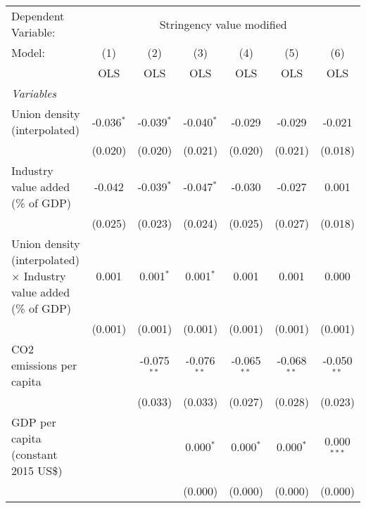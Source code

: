 
\begingroup
\centering
\begin{tabular}{lcccccc}
   \toprule
   Dependent Variable: & \multicolumn{6}{c}{Stringency value modified}\\
   Model:                                                                   & (1)          & (2)           & (3)           & (4)           & (5)           & (6)\\  
                                                                            &  OLS         & OLS           & OLS           & OLS           & OLS           & OLS\\  
   \midrule
   \emph{Variables}\\
   Union density (interpolated)                                             & -0.036$^{*}$ & -0.039$^{*}$  & -0.040$^{*}$  & -0.029        & -0.029        & -0.021\\   
                                                                            & (0.020)      & (0.020)       & (0.021)       & (0.020)       & (0.021)       & (0.018)\\   
   Industry value added (\% of GDP)                                         & -0.042       & -0.039$^{*}$  & -0.047$^{*}$  & -0.030        & -0.027        & 0.001\\   
                                                                            & (0.025)      & (0.023)       & (0.024)       & (0.025)       & (0.027)       & (0.018)\\   
   Union density (interpolated) $\times$ Industry value added (\% of GDP)   & 0.001        & 0.001$^{*}$   & 0.001$^{*}$   & 0.001         & 0.001         & 0.000\\   
                                                                            & (0.001)      & (0.001)       & (0.001)       & (0.001)       & (0.001)       & (0.001)\\   
   CO2 emissions per capita                                                 &              & -0.075$^{**}$ & -0.076$^{**}$ & -0.065$^{**}$ & -0.068$^{**}$ & -0.050$^{**}$\\   
                                                                            &              & (0.033)       & (0.033)       & (0.027)       & (0.028)       & (0.023)\\   
   GDP per capita (constant 2015 US\$)                                      &              &               & 0.000$^{*}$   & 0.000$^{*}$   & 0.000$^{*}$   & 0.000$^{***}$\\   
                                                                            &              &               & (0.000)       & (0.000)       & (0.000)       & (0.000)\\   

\end{tabular}
